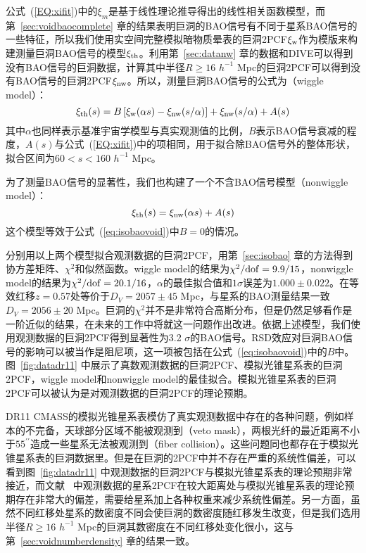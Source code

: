 {公式~(\ref{EQ:xifit})中的$\xi_{m}$是基于线性理论推导得出的线性相关函数模型，而第~\ref{sec:voidbaocomplete} 章的结果表明巨洞的BAO信号有不同于星系BAO信号的一些特征，所以我们使用实空间完整模拟暗物质晕表的巨洞2PCF$\xi_{\rm w}$作为模版来构建测量巨洞BAO信号的模型$\xi_{\rm th}$。利用第~\ref{sec:datanw} 章的数据和DIVE可以得到没有BAO信号的巨洞数据，计算其中半径$R \geq 16$ $h^{-1}$ Mpc的巨洞2PCF可以得到没有BAO信号的巨洞2PCF$\xi_{\rm nw}$。所以，测量巨洞BAO信号的公式为（wiggle model）：
\begin{equation}
\label{eq:isobaovoid}
\xi_{\rm th}(s) = B\,[\xi_{\rm w}(\alpha s) - \xi_{\rm nw}(s/\alpha)] + \xi_{\rm nw}(s/\alpha) + A(s)
\end{equation}
其中$\alpha$也同样表示基准宇宙学模型与真实观测值的比例，$B$表示BAO信号衰减的程度，$A(s)$与公式~(\ref{EQ:xifit})中的项相同，用于拟合除BAO信号外的整体形状，拟合区间为$60 < s < 160$ $h^{-1}$ Mpc。

为了测量BAO信号的显著性，我们也构建了一个不含BAO信号模型（nonwiggle model）：
\begin{equation}
\xi_{\rm th}(s) = \xi_{\rm nw}(\alpha s) + A(s)
\end{equation}
这个模型等效于公式~(\ref{eq:isobaovoid})中$B = 0$的情况。

分别用以上两个模型拟合观测数据的巨洞2PCF，用第~\ref{sec:isobao} 章的方法得到协方差矩阵、$\chi^2$和似然函数。wiggle model的结果为$\chi^2/{\rm dof}=9.9/15$，nonwiggle model的结果为$\chi^2/{\rm dof}=20.1/16$，$\alpha$的最佳拟合值和$1\sigma$误差为$1.000 \pm 0.022$。在等效红移$z=0.57$处等价于$D_V = 2057 \pm 45$ Mpc，与星系的BAO测量结果一致$D_V = 2056 \pm 20$ Mpc。巨洞的$\chi^2$并不是非常符合高斯分布，但是仍然足够看作是一阶近似的结果，在未来的工作中将就这一问题作出改进。依据上述模型，我们使用观测数据的巨洞2PCF得到显著性为3.2 $\sigma$的BAO信号。RSD效应对巨洞BAO信号的影响可以被当作是阻尼项，这一项被包括在公式~(\ref{eq:isobaovoid})中的$B$中。图~\ref{fig:datadr11} 中展示了真数观测数据的巨洞2PCF、模拟光锥星系表的巨洞2PCF，wiggle model和nonwiggle model的最佳拟合。模拟光锥星系表的巨洞2PCF可以被认为是对观测数据的巨洞2PCF的理论预期。

DR11 CMASS的模拟光锥星系表模仿了真实观测数据中存在的各种问题，例如样本的不完备，天球部分区域不能被观测到（veto mask），两根光纤的最近距离不小于$55^{\prime\prime}$造成一些星系无法被观测到（fiber collision）。这些问题同也都存在于模拟光锥星系表的巨洞数据里。但是在巨洞的2PCF中并不存在严重的系统性偏差，可以看到图~\ref{fig:datadr11} 中观测数据的巨洞2PCF与模拟光锥星系表的理论预期非常接近，而文献 ~中观测数据的星系2PCF在较大距离处与模拟光锥星系表的理论预期存在非常大的偏差，需要给星系加上各种权重来减少系统性偏差。另一方面，虽然不同红移处星系的数密度不同会使巨洞的数密度随红移发生改变，但是我们选用半径$R \geq 16$ $h^{-1}$ Mpc的巨洞其数密度在不同红移处变化很小，这与第~\ref{sec:voidnumberdensity} 章的结果一致。

}
